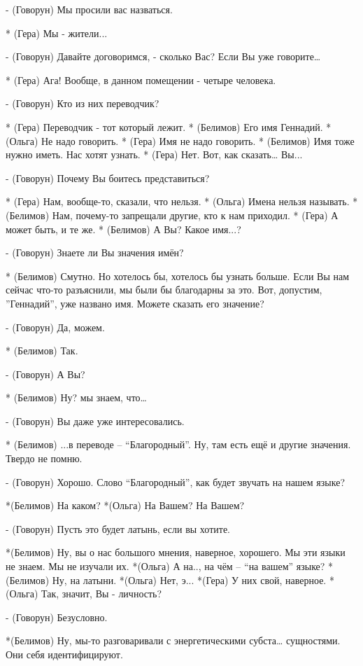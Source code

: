 - (Говорун) Мы просили вас назваться.

* (Гера) Мы - жители...

- (Говорун) Давайте договоримся, - сколько Вас? Если Вы уже говорите…

* (Гера) Ага! Вообще, в данном помещении - четыре человека.

- (Говорун) Кто из них переводчик?

* (Гера) Переводчик - тот который лежит.
* (Белимов) Его имя Геннадий.
* (Ольга) Не надо говорить.
* (Гера) Имя не надо говорить.
* (Белимов) Имя тоже нужно иметь. Нас хотят узнать.
* (Гера) Нет. Вот, как сказать… Вы...

- (Говорун) Почему Вы боитесь представиться?

* (Гера) Нам, вообще-то, сказали, что нельзя.
* (Ольга) Имена нельзя называть.
* (Белимов) Нам, почему-то запрещали  другие, кто к нам приходил.
* (Гера) А может быть, и те же.
* (Белимов) А Вы? Какое имя...?

- (Говорун) Знаете ли Вы значения имён?

* (Белимов) Смутно. Но хотелось бы, хотелось бы узнать больше. Если Вы нам сейчас что-то разъяснили, мы были бы благодарны за это. Вот, допустим, ”Геннадий”, уже названо имя. Можете сказать его значение?

- (Говорун) Да, можем.

* (Белимов) Так.

- (Говорун) А Вы?

* (Белимов) Ну? мы знаем, что…

- (Говорун) Вы даже уже интересовались.

* (Белимов) ...в переводе – “Благородный”. Ну, там есть ещё и другие значения. Твердо не помню.

- (Говорун) Хорошо. Слово “Благородный”, как будет звучать на нашем языке?

*(Белимов) На каком?
*(Ольга) На Вашем?  На Вашем?

- (Говорун) Пусть это будет латынь, если вы хотите.

*(Белимов) Ну, вы о нас большого мнения, наверное, хорошего. Мы эти языки не знаем. Мы не изучали их.
*(Ольга) А на.., на чём – “на вашем” языке?
*(Белимов) Ну, на латыни.
*(Ольга) Нет, э...
*(Гера) У них свой, наверное.
*(Ольга) Так, значит, Вы - личность?

- (Говорун) Безусловно.

*(Белимов) Ну, мы-то разговаривали с энергетическими субста… сущностями. Они себя идентифицируют.

